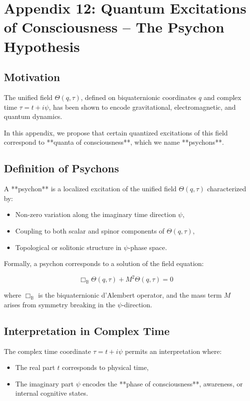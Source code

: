 
\section*{Appendix 12: Quantum Excitations of Consciousness – The Psychon Hypothesis}

\subsection*{Motivation}

The unified field \(\Theta(q, \tau)\), defined on biquaternionic coordinates \(q\) and complex time \(\tau = t + i\psi\),
has been shown to encode gravitational, electromagnetic, and quantum dynamics.

In this appendix, we propose that certain quantized excitations of this field correspond to **quanta of consciousness**,
which we name **psychons**.

\subsection*{Definition of Psychons}

A **psychon** is a localized excitation of the unified field \(\Theta(q, \tau)\) characterized by:
\begin{itemize}
  \item Non-zero variation along the imaginary time direction \(\psi\),
  \item Coupling to both scalar and spinor components of \(\Theta(q, \tau)\),
  \item Topological or solitonic structure in \(\psi\)-phase space.
\end{itemize}

Formally, a psychon corresponds to a solution of the field equation:

\[
\Box_{\mathbb{B}} \Theta(q, \tau) + M^2 \Theta(q, \tau) = 0
\]

where \(\Box_{\mathbb{B}}\) is the biquaternionic d'Alembert operator, and the mass term \(M\) arises from symmetry breaking in the \(\psi\)-direction.

\subsection*{Interpretation in Complex Time}

The complex time coordinate \(\tau = t + i\psi\) permits an interpretation where:
\begin{itemize}
  \item The real part \(t\) corresponds to physical time,
  \item The imaginary part \(\psi\) encodes the **phase of consciousness**, awareness, or internal cognitive states.
\end{itemize}

